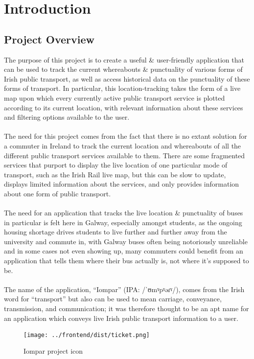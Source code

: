 \documentclass[a4paper,11pt]{report}
\begin{document}
\chapter{Introduction}
\section{Project Overview}
The purpose of this project is to create a useful \& user-friendly application that can be used to track the current whereabouts \& punctuality of various forms of Irish public transport, as well as access historical data on the punctuality of these forms of transport.
In particular, this location-tracking takes the form of a live map upon which every currently active public transport service is plotted according to its current location, with relevant information about these services and filtering options available to the user.
\\\\
The need for this project comes from the fact that there is no extant solution for a commuter in Ireland to track the current location and whereabouts of all the different public transport services available to them.
There are some fragmented services that purport to display the live location of one particular mode of transport, such as the Irish Rail live map\supercite{liveir}, but this can be slow to update, displays limited information about the services, and only provides information about one form of public transport.
\\\\
The need for an application that tracks the live location \& punctuality of buses in particular is felt here in Galway, especially amongst students, as the ongoing housing shortage drives students to live further and further away from the university and commute in, with Galway buses often being notoriously unreliable and in some cases not even showing up, many commuters could benefit from an application that tells them where their bus actually is, not where it's supposed to be.
\\\\
The name of the application, ``Iompar'' (IPA: /ˈʊmˠpˠəɾˠ/), comes from the Irish word for ``transport'' but also can be used to mean carriage, conveyance, transmission, and communication\supercite{iompar_teanglann};
it was therefore thought to be an apt name for an application which conveys live Irish public transport information to a user.

\begin{figure}[H]
    \centering
    \texttt{[image: ../frontend/dist/ticket.png]}
    \caption{Iompar project icon\supercite{trainticket}}
\end{figure}
\end{document}
